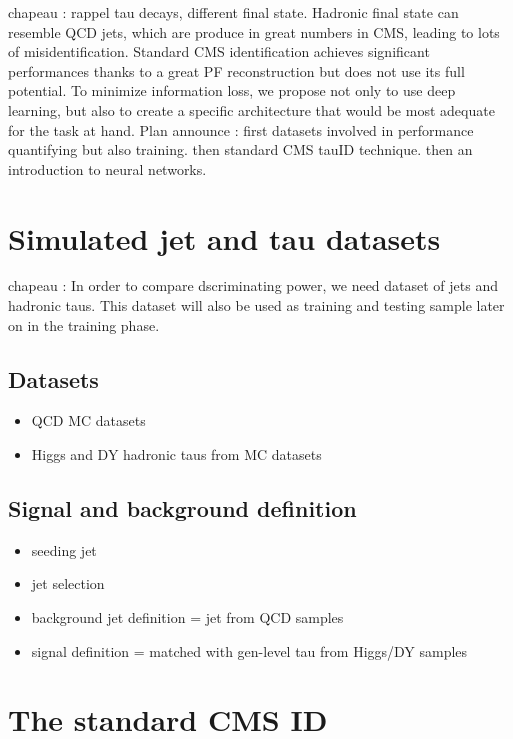 chapeau : rappel tau decays, different final state. Hadronic final state can resemble QCD jets, which are produce in great numbers in CMS, leading to lots of misidentification. Standard CMS identification achieves significant performances thanks to a great PF reconstruction but does not use its full potential. To minimize information loss, we propose not only to use deep learning, but also to create a specific architecture that would be most adequate for the task at hand. Plan announce : first datasets involved in performance quantifying but also training. then standard CMS tauID technique. then an introduction to neural networks.

\section{Simulated jet and tau datasets}
chapeau : In order to compare dscriminating power, we need dataset of jets and hadronic taus. This dataset will also be used as training and testing sample later on in the training phase.

\subsection{Datasets}

\begin{itemize}
    \item QCD MC datasets
    \item Higgs and DY hadronic taus from MC datasets
\end{itemize}

\subsection{Signal and background definition}

\begin{itemize}
    \item seeding jet
    \item jet selection
    \item background jet definition = jet from QCD samples
    \item signal definition = matched with gen-level tau from Higgs/DY samples
\end{itemize}

\section{The standard CMS \tauh ID}

